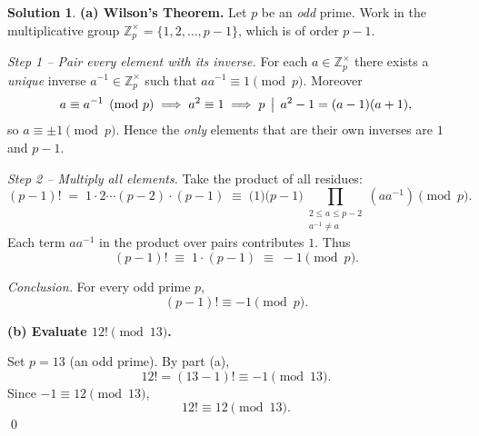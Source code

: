 \documentclass[12pt]{article}
\theoremstyle{definition} %
\newtheorem{solution}{Solution}
\theoremstyle{plain} %
\begin{document}
                \begin{solution}
                  \textbf{(a)  Wilson’s Theorem.}  
                  Let $p$ be an \emph{odd} prime.  
                  Work in the multiplicative group $\mathbb{Z}_{p}^{\times}=\{1,2,\dots ,p-1\}$,
                  which is of order $p-1$.
                  
                  \smallskip
                  \textit{Step 1 – Pair every element with its inverse.}  
                  For each $a\in\mathbb{Z}_{p}^{\times}$ there exists a \emph{unique} inverse
                  $a^{-1}\in\mathbb{Z}_{p}^{\times}$ such that $aa^{-1}\equiv 1\pmod{p}$.
                  Moreover
                  \[
                         a\equiv a^{-1}\pmod{p}
                         \;\Longrightarrow\;
                         a^{2}\equiv 1
                         \;\Longrightarrow\;
                         p\,\bigm|\,a^{2}-1=(a-1)(a+1),
                  \]
                  so $a\equiv \pm1\pmod{p}$.  
                  Hence the \emph{only} elements that are their own inverses are
                  $1$ and $p-1$.
                  
                  \smallskip
                  \textit{Step 2 – Multiply all elements.}  
                  Take the product of all residues:
                  \[
                        (p-1)!
                        \;=\;
                        1\cdot 2\cdots(p-2)\cdot(p-1)
                        \;\equiv\;
                        \bigl(1\bigr)\bigl(p-1\bigr)
                          \!\!\!\!
                          \prod_{\substack{2\le a\le p-2\\ a^{-1}\neq a}}
                          \!\!\!\! (aa^{-1})
                        \pmod{p}.
                  \]
                  Each term $aa^{-1}$ in the product over pairs contributes $1$.
                  Thus
                  \[
                        (p-1)!\;\equiv\; 1\cdot(p-1)\;\equiv\;-1\pmod{p}.
                  \]
                  
                  \smallskip
                  \textit{Conclusion.}\;
                  For every odd prime $p$,
                  \[
                        \boxed{(p-1)! \equiv -1 \pmod{p}}.
                  \]
                  
                  \bigskip
                  \textbf{(b)  Evaluate $12!\pmod{13}$.}
                  
                  Set $p=13$ (an odd prime).  
                  By part (a),
                  \[
                        12! = (13-1)! \equiv -1 \pmod{13}.
                  \]
                  Since $-1\equiv 12\pmod{13}$,
                  \[
                        \boxed{12!\equiv 12 \pmod{13}}.
                  \]
                  \qed
                  \end{solution}
\end{document}
